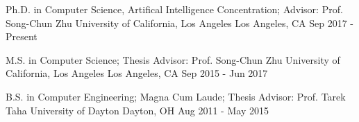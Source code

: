 


\begin{cventries}


\cventry
{Ph.D. in Computer Science, Artifical Intelligence Concentration; Advisor: Prof. Song-Chun Zhu}
{University of California, Los Angeles} %
{Los Angeles, CA} %
{Sep 2017 - Present} %
{ %
}
\vspace{-4mm}


\cventry
{M.S. in Computer Science; Thesis Advisor: Prof. Song-Chun Zhu}
{University of California, Los Angeles} %
{Los Angeles, CA} %
{Sep 2015 - Jun 2017} %
{ %
}
\vspace{-4mm}


\cventry
{B.S. in Computer Engineering; Magna Cum Laude; Thesis Advisor: Prof. Tarek Taha}
{University of Dayton} %
{Dayton, OH} %
{Aug 2011 - May 2015} %
{ %
}
\vspace{-4mm}


\end{cventries}